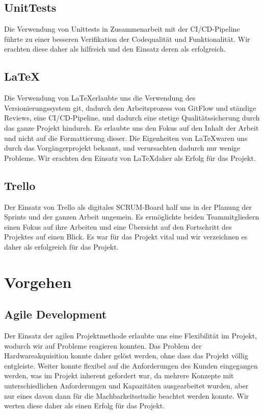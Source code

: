 \subsection{UnitTests}
Die Verwendung von Unittests in Zusammenarbeit mit der CI/CD-Pipeline führte zu einer besseren Verifikation der Codequalität und Funktionalität. Wir erachten diese daher als hilfreich und den Einsatz deren als erfolgreich.

\subsection{\LaTeX}
Die Verwendung von \LaTeX erlaubte uns die Verwendung des Versionierungssystem git, dadurch den Arbeitsprozess von GitFlow und ständige Reviews, eine CI/CD-Pipeline, und dadurch eine stetige Qualitätssicherung durch das ganze Projekt hindurch. Es erlaubte uns den Fokus auf den Inhalt der Arbeit und nicht auf die Formattierung dieser. Die Eigenheiten von \LaTeX waren uns durch das Vorgängerprojekt bekannt, und verursachten dadurch nur wenige Probleme. Wir erachten den Einsatz von \LaTeX daher als Erfolg für das Projekt.

\subsection{Trello}
Der Einsatz von Trello als digitales SCRUM-Board half uns in der Planung der Sprints und der ganzen Arbeit ungemein. Es ermöglichte beiden Teammitgliedern einen Fokus auf ihre Arbeiten und eine Übersicht auf den Fortschritt des Projektes auf einen Blick. Es war für das Projekt vital und wir verzeichnen es daher als erfolgreich für das Projekt.

\section{Vorgehen}
\subsection{Agile Development}
Der Einsatz der agilen Projektmethode erlaubte uns eine Flexibilität im Projekt, wodurch wir auf Probleme reagieren konnten. Das Problem der Hardwareakquisition konnte daher gelöst werden, ohne dass das Projekt völlig entgleiste. Weiter konnte flexibel auf die Anforderungen des Kunden eingegangen werden, was im Projekt inherent gefordert war, da mehrere Konzepte mit unterschiedlichen Anforderungen und Kapazitäten ausgearbeitet wurden, aber nur eines davon dann für die Machbarkeitsstudie beachtet werden konnte. Wir werten diese daher als einen Erfolg für das Projekt.

